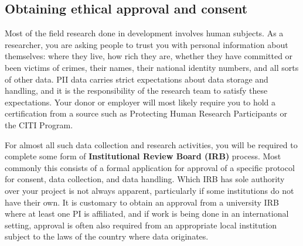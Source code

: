 \subsection{Obtaining ethical approval and consent}

Most of the field research done in development involves human subjects.
As a researcher, you are asking people to trust you with personal information about themselves:
where they live, how rich they are, whether they have committed or been victims of crimes,
their names, their national identity numbers, and all sorts of other data.
PII data carries strict expectations about data storage and handling,
and it is the responsibility of the research team to satisfy these expectations.
Your donor or employer will most likely require you to hold a certification from a source
such as Protecting Human Research Participants
or the CITI Program.

For almost all such data collection and research activities,
you will be required to complete some form of \textbf{Institutional Review Board (IRB)} process.
Most commonly this consists of a formal application for approval of a specific
protocol for consent, data collection, and data handling.
Which IRB has sole authority over your project is not always apparent,
particularly if some institutions do not have their own.
It is customary to obtain an approval from a university IRB
where at least one PI is affiliated,
and if work is being done in an international setting,
approval is often also required
from an appropriate local institution subject to the laws of the country where data originates.

